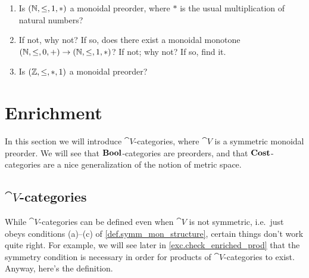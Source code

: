 \documentclass[7Sketches]{subfiles}
\begin{document}
\begin{exercise}%
\label{exc.natural_monotone}
\begin{enumerate}
	\item Is $(\mathbb{N},\leq,1,*)$ a monoidal preorder, where $*$ is the usual multiplication of natural numbers?
	\item If not, why not? If so, does there exist a monoidal monotone $(\mathbb{N},\leq,0,+)\to(\mathbb{N},\leq,1,*)$? If not; why not? If so, find it.
	\item Is $(\mathbb{Z},\leq,*,1)$ a monoidal preorder?
\qedhere
\end{enumerate}
\end{exercise}

%
%

\section{Enrichment}%
\label{sec.enrichment}%

In this section we will introduce $\cat{V}$-categories, where $\cat{V}$ is a
symmetric monoidal preorder. We will see that $\mathbf{Bool}$-categories are preorders, and
that $\mathbf{Cost}$-categories are a nice generalization of the notion of metric space.

\subsection{$\cat{V}$-categories}%
\label{subsec.V_cats}%

While $\cat{V}$-categories can be defined even when $\cat{V}$ is not symmetric,
i.e.\ just obeys conditions (a)--(c) of \cref{def.symm_mon_structure}, certain things don't work quite right. For example, we will see later in \cref{exc.check_enriched_prod} that the symmetry condition is necessary in order for products of $\cat{V}$-categories to exist. Anyway, here's the definition.
\end{document}
